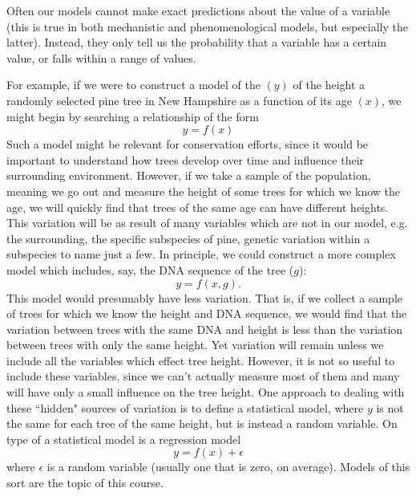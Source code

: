 Often our models cannot make exact predictions about the value of a variable (this is true in both mechanistic and phenomenological models, but especially the latter). Instead, they only tell us the probability that a variable has a certain value, or falls within a range of values. 

For example, if we were to construct a model of the $(y)$ of the height a randomly selected pine tree in New Hampshire as a function of its age $(x)$, we might begin by searching a relationship of the form
\begin{equation}
y = f(x)
\end{equation}
Such a model might be relevant for conservation efforts, since it would be important to understand how trees develop over time and influence their surrounding environment. 
However, if we take a {\dfn sample} of the population, meaning we go out and measure the height of some trees for which we know the age, we will quickly find that trees of the same age can have different heights.   This variation will be as result of many variables which are not in our model, e.g. the surrounding, the specific subspecies of pine, genetic variation within a subspecies to name just a few. In principle, we could construct a more complex model which includes, say, the DNA sequence of the tree ($g$):
\begin{equation}
y = f(x,g).
\end{equation}
This model would presumably have less variation. That is, if we collect a sample of trees for which we know the height and DNA sequence, we would find that the variation between trees with the same DNA and height is less than the variation between trees with only the same height. Yet variation will remain unless we include all the variables which effect tree height. However, it is not so useful to include these variables, since we can't actually measure most of them and many will have only a small influence on the tree height. One approach to dealing with these ``hidden" sources of variation is to define a {\dfn statistical model}, where $y$ is not the same for each tree of the same height, but is instead a {\dfn random variable}. On type of a statistical model is a regression model
\begin{equation}\label{eq:reg}
y = f(x) + \epsilon
\end{equation}
where $\epsilon$ is a random variable (usually one that is zero, on average). Models of this sort are the topic of this course. 



